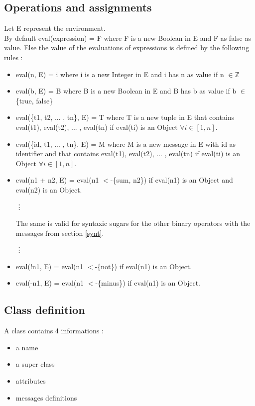 \documentclass{eplDoc}
\begin{document}
\subsection{Operations and assignments}
Let E represent the environment. \\ 
By default eval(expression) = F where F is a new Boolean in E and F as false as value. Else the value of the evaluations of expressions is defined by the following rules : 
\begin{itemize}
\item eval(n, E) = i where i is a new Integer in E and i has n as value if n $\in \mathbb{Z}$ 

\item eval(b, E) = B where B is a new Boolean in E and B has b as value if b $\in$ \{true, false\} 

\item eval(\{t1, t2, ... , tn\}, E) = T where T is a new tuple in E that contains eval(t1), eval(t2), ... , eval(tn) if eval(ti) is an Object $\forall i \in [1,n]$. 

\item eval(\{id, t1, ... , tn\}, E) = M where M is a new message in E with id as identifier and that contains eval(t1), eval(t2), ... , eval(tn) if eval(ti) is an Object $\forall i \in [1,n]$. 

\item eval(n1 + n2, E) = eval(n1 $<$-\{sum, n2\}) if eval(n1) is an Object and eval(n2) is an Object. \\
\begin{center}
\vdots  \\
\end{center}
 
The same is valid for syntaxic sugars for the other binary operators with the messages from section \ref{synt}.                      
\begin{center}
\vdots \\
\end{center}
  
\item eval(!n1, E) = eval(n1 $<$-\{not\}) if eval(n1) is an Object. 
\item eval(-n1, E) = eval(n1 $<$-\{minus\}) if eval(n1) is an Object. 

\end{itemize}



\subsection{Class definition}
A class contains 4 informations : 
\begin{itemize}
    \item a name
    \item a super class
    \item attributes 
    \item messages definitions
\end{itemize}
\end{document}
